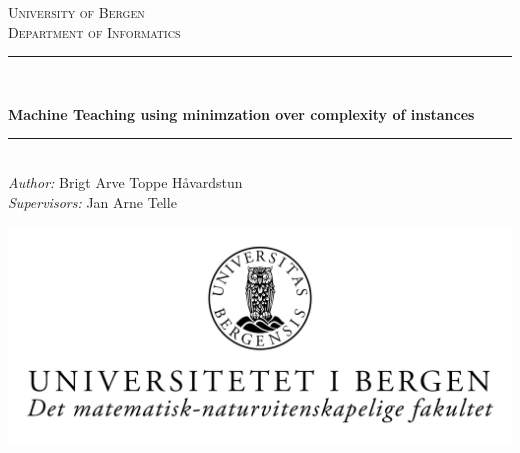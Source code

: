 \begin{titlepage}

\newcommand{\HRule}{\rule{\linewidth}{0.5mm}} %

\center %
 

\textsc{\LARGE University of Bergen \\ Department of Informatics}\\[1.5cm] %


\HRule \\[0.5cm]
\begin{Huge}
	\bfseries{Machine Teaching using minimzation over complexity of instances}\\[0.7cm] %
\end{Huge}
\HRule \\[0.5cm]


\large \emph{Author:} Brigt Arve Toppe Håvardstun\\
\large \emph{Supervisors:} Jan Arne Telle\\[2cm]


\centerline{\includegraphics[scale=1.9]{figures/canvasWithFaculty}}


\end{titlepage}

